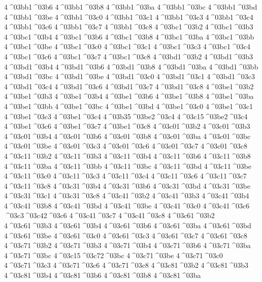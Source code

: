 {4^^^^03bb1^^^^03b6
4^^^^03bb1^^^^03b8
4^^^^03bb1^^^^03ba
4^^^^03bb1^^^^03bc
4^^^^03bb1^^^^03bd
4^^^^03bb1^^^^03be
4^^^^03bb1^^^^03c0
4^^^^03bb1^^^^03c1
4^^^^03bb1^^^^03c3
4^^^^03bb1^^^^03c4
4^^^^03bb1^^^^03c6
4^^^^03bb1^^^^03c7
4^^^^03bb1^^^^03c8
4^^^^03bc1^^^^03b2
4^^^^03bc1^^^^03b3
4^^^^03bc1^^^^03b4
4^^^^03bc1^^^^03b6
4^^^^03bc1^^^^03b8
4^^^^03bc1^^^^03ba
4^^^^03bc1^^^^03bb
4^^^^03bc1^^^^03be
4^^^^03bc1^^^^03c0
4^^^^03bc1^^^^03c1
4^^^^03bc1^^^^03c3
4^^^^03bc1^^^^03c4
4^^^^03bc1^^^^03c6
4^^^^03bc1^^^^03c7
4^^^^03bc1^^^^03c8
4^^^^03bd1^^^^03b2
4^^^^03bd1^^^^03b3
4^^^^03bd1^^^^03b4
4^^^^03bd1^^^^03b6
4^^^^03bd1^^^^03b8
4^^^^03bd1^^^^03ba
4^^^^03bd1^^^^03bb
4^^^^03bd1^^^^03bc
4^^^^03bd1^^^^03be
4^^^^03bd1^^^^03c0
4^^^^03bd1^^^^03c1
4^^^^03bd1^^^^03c3
4^^^^03bd1^^^^03c4
4^^^^03bd1^^^^03c6
4^^^^03bd1^^^^03c7
4^^^^03bd1^^^^03c8
4^^^^03be1^^^^03b2
4^^^^03be1^^^^03b3
4^^^^03be1^^^^03b4
4^^^^03be1^^^^03b6
4^^^^03be1^^^^03b8
4^^^^03be1^^^^03ba
4^^^^03be1^^^^03bb
4^^^^03be1^^^^03bc
4^^^^03be1^^^^03bd
4^^^^03be1^^^^03c0
4^^^^03be1^^^^03c1
4^^^^03be1^^^^03c3
4^^^^03be1^^^^03c4
4^^^^03b35^^^^03be2^^^^03c4
4^^^^03c15^^^^03be2^^^^03c4
4^^^^03be1^^^^03c6
4^^^^03be1^^^^03c7
4^^^^03be1^^^^03c8
4^^^^03c01^^^^03b2
4^^^^03c01^^^^03b3
4^^^^03c01^^^^03b4
4^^^^03c01^^^^03b6
4^^^^03c01^^^^03b8
4^^^^03c01^^^^03ba
4^^^^03c01^^^^03bc
4^^^^03c01^^^^03be
4^^^^03c01^^^^03c3
4^^^^03c01^^^^03c6
4^^^^03c01^^^^03c7
4^^^^03c01^^^^03c8
4^^^^03c11^^^^03b2
4^^^^03c11^^^^03b3
4^^^^03c11^^^^03b4
4^^^^03c11^^^^03b6
4^^^^03c11^^^^03b8
4^^^^03c11^^^^03ba
4^^^^03c11^^^^03bb
4^^^^03c11^^^^03bc
4^^^^03c11^^^^03bd
4^^^^03c11^^^^03be
4^^^^03c11^^^^03c0
4^^^^03c11^^^^03c3
4^^^^03c11^^^^03c4
4^^^^03c11^^^^03c6
4^^^^03c11^^^^03c7
4^^^^03c11^^^^03c8
4^^^^03c31^^^^03b4
4^^^^03c31^^^^03b6
4^^^^03c31^^^^03bd
4^^^^03c31^^^^03be
4^^^^03c31^^^^03c1
4^^^^03c31^^^^03c8
4^^^^03c41^^^^03b2
4^^^^03c41^^^^03b3
4^^^^03c41^^^^03b4
4^^^^03c41^^^^03b8
4^^^^03c41^^^^03bd
4^^^^03c41^^^^03be
4^^^^03c41^^^^03c0
4^^^^03c41^^^^03c6
^^^^03c3^^^^03c42^^^^03c6
4^^^^03c41^^^^03c7
4^^^^03c41^^^^03c8
4^^^^03c61^^^^03b2
4^^^^03c61^^^^03b3
4^^^^03c61^^^^03b4
4^^^^03c61^^^^03b6
4^^^^03c61^^^^03ba
4^^^^03c61^^^^03bd
4^^^^03c61^^^^03be
4^^^^03c61^^^^03c0
4^^^^03c61^^^^03c3
4^^^^03c61^^^^03c7
4^^^^03c61^^^^03c8
4^^^^03c71^^^^03b2
4^^^^03c71^^^^03b3
4^^^^03c71^^^^03b4
4^^^^03c71^^^^03b6
4^^^^03c71^^^^03ba
4^^^^03c71^^^^03bc
4^^^^03c15^^^^03c72^^^^03bc
4^^^^03c71^^^^03be
4^^^^03c71^^^^03c0
4^^^^03c71^^^^03c3
4^^^^03c71^^^^03c6
4^^^^03c71^^^^03c8
4^^^^03c81^^^^03b2
4^^^^03c81^^^^03b3
4^^^^03c81^^^^03b4
4^^^^03c81^^^^03b6
4^^^^03c81^^^^03b8
4^^^^03c81^^^^03ba
}
